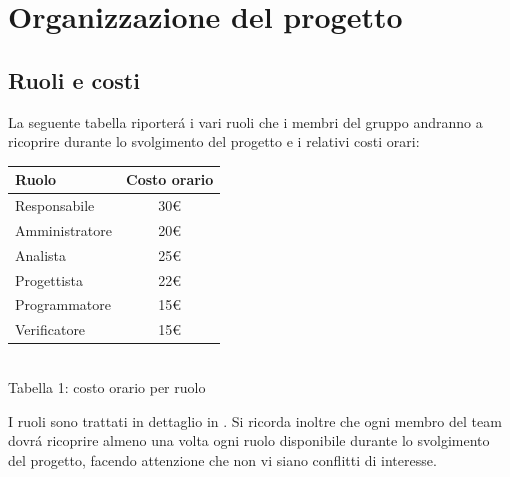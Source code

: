 \section{Organizzazione del progetto}
\subsection{Ruoli e costi}
La seguente tabella riporter\'a i vari ruoli che i membri del gruppo \gruppo andranno a ricoprire durante lo svolgimento del progetto e i relativi costi orari:
\begin{center}
\centering
\begin{tabular}{| l | c |}
\hline
Ruolo & Costo orario \\
\hline
Responsabile & 30\euro \\
Amministratore & 20\euro \\
Analista & 25\euro \\
Progettista & 22\euro \\
Programmatore & 15\euro \\
Verificatore & 15\euro \\
\hline
\end{tabular}
\\
Tabella 1: costo orario per ruolo
\end{center}
I ruoli sono trattati in dettaglio in \VerbaleB.
Si ricorda inoltre che ogni membro del team dovr\'a ricoprire almeno una volta ogni ruolo disponibile durante lo svolgimento del progetto, facendo attenzione che non vi siano conflitti di interesse.
